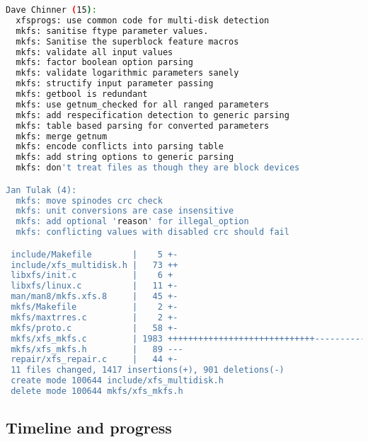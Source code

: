 \begin{desciption}
\begin{lstlisting}[frame=none, basicstyle=\footnotesize\ttfamily,
language=Bash, numbers=none, numberstyle=\tiny\color{black},caption= {Git
statistics for the first patchset~\cite{finalPatchset1}. Note: Git
attributes changes only to the first author of each commit.},
label={lst:refactoring:initialcodebase}]
Dave Chinner (15):
  xfsprogs: use common code for multi-disk detection
  mkfs: sanitise ftype parameter values.
  mkfs: Sanitise the superblock feature macros
  mkfs: validate all input values
  mkfs: factor boolean option parsing
  mkfs: validate logarithmic parameters sanely
  mkfs: structify input parameter passing
  mkfs: getbool is redundant
  mkfs: use getnum_checked for all ranged parameters
  mkfs: add respecification detection to generic parsing
  mkfs: table based parsing for converted parameters
  mkfs: merge getnum
  mkfs: encode conflicts into parsing table
  mkfs: add string options to generic parsing
  mkfs: don't treat files as though they are block devices

Jan Tulak (4):
  mkfs: move spinodes crc check
  mkfs: unit conversions are case insensitive
  mkfs: add optional 'reason' for illegal_option
  mkfs: conflicting values with disabled crc should fail

 include/Makefile        |    5 +-
 include/xfs_multidisk.h |   73 ++
 libxfs/init.c           |    6 +
 libxfs/linux.c          |   11 +-
 man/man8/mkfs.xfs.8     |   45 +-
 mkfs/Makefile           |    2 +-
 mkfs/maxtrres.c         |    2 +-
 mkfs/proto.c            |   58 +-
 mkfs/xfs_mkfs.c         | 1983 +++++++++++++++++++++++++++++------------------
 mkfs/xfs_mkfs.h         |   89 ---
 repair/xfs_repair.c     |   44 +-
 11 files changed, 1417 insertions(+), 901 deletions(-)
 create mode 100644 include/xfs_multidisk.h
 delete mode 100644 mkfs/xfs_mkfs.h
\end{lstlisting}

\subsection{Timeline and progress}


\end{desciption}
